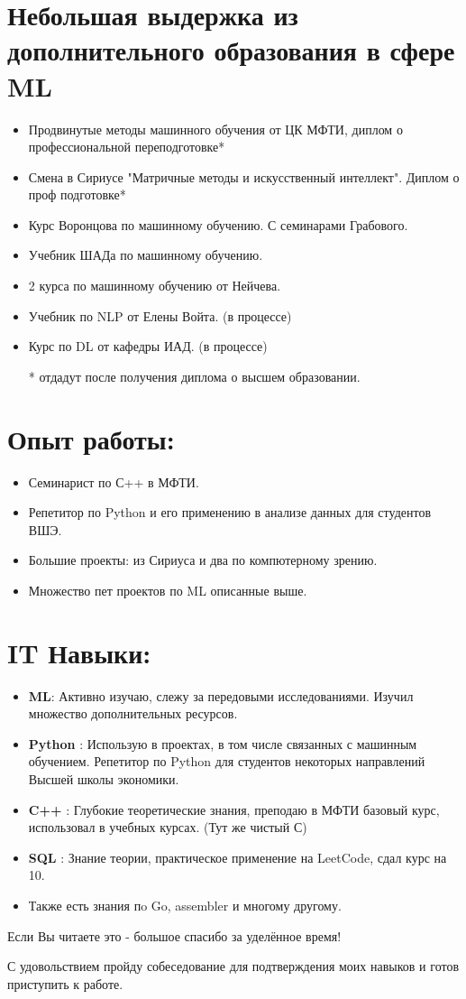 \documentclass{article}
\begin{document}
\section*{Небольшая выдержка из дополнительного образования в сфере ML}
\begin{itemize}
    \item Продвинутые методы машинного обучения от ЦК МФТИ, диплом о профессиональной переподготовке*
    \item Смена в Сириусе "Матричные методы и искусственный интеллект". Диплом о проф подготовке* 
    \item Курс Воронцова по машинному обучению. С семинарами Грабового.
    \item Учебник ШАДа по машинному обучению.
    \item 2 курса по машинному обучению от Нейчева.
    \item Учебник по NLP от Елены Войта. (в процессе)
    \item Курс по DL от кафедры ИАД. (в процессе)  
    
* отдадут после получения диплома о высшем образовании.
\end{itemize}

\section*{Опыт работы:}
\begin{itemize}
\item  Семинарист по С++ в МФТИ.
\item  Репетитор по Python и его применению в анализе данных для студентов ВШЭ.
\item  Большие проекты: из Сириуса и два по компютерному зрению.
\item  Множество пет проектов по ML описанные выше.
\end{itemize}

\section*{IT Навыки:}
\begin{itemize}
\item \textbf{ML}: Активно изучаю, слежу за передовыми исследованиями. Изучил множество дополнительных ресурсов.
\item \textbf{Python} : Использую в проектах, в том числе связанных с машинным обучением. Репетитор по Python для студентов некоторых направлений Высшей школы экономики.
\item \textbf{C++} : Глубокие теоретические знания, преподаю в МФТИ базовый курс, использовал в учебных курсах. (Тут же чистый С)
\item \textbf{SQL} : Знание теории, практическое применение на LeetCode, сдал курс на 10.
\item Также есть знания пo Go, assembler и многому другому.
\end{itemize}



Если Вы читаете это - большое спасибо за уделённое время! 

С удовольствием пройду собеседование для подтверждения моих навыков и готов приступить к работе.
\end{document}
